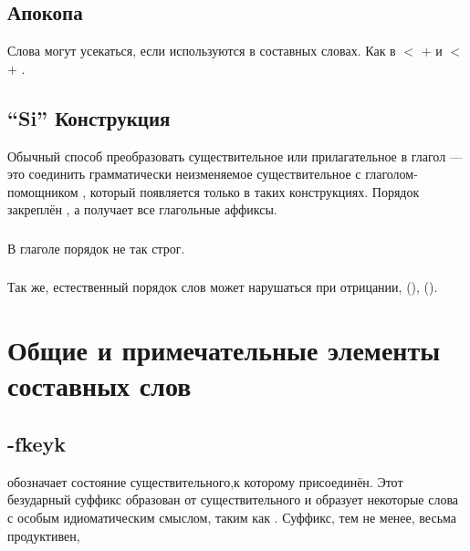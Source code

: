 \subsection{Апокопа} Слова могут усекаться, если используются в составных словах. Как в   $<$   $+$
  и   $<$
  $+$  .


\subsection{``Si'' Конструкция} Обычный способ преобразовать существительное или прилагательное в глагол — это соединить грамматически неизменяемое существительное с глаголом-помощником
, который появляется только в таких конструкциях.  Порядок закреплён , а  получает все глагольные аффиксы.\label{lingop:si-const}

\subsubsection{} В глаголе   порядок не так строг.

\subsubsection{} Так же, естественный порядок слов  может нарушаться при отрицании,   (),
  ().


\section{Общие и примечательные элементы составных слов}

\subsection{-fkeyk} обозначает состояние существительного,к которому присоединён. Этот безударный суффикс образован от существительного   и образует некоторые слова с особым идиоматическим смыслом, таким как 
. Суффикс, тем не менее, весьма продуктивен,  

